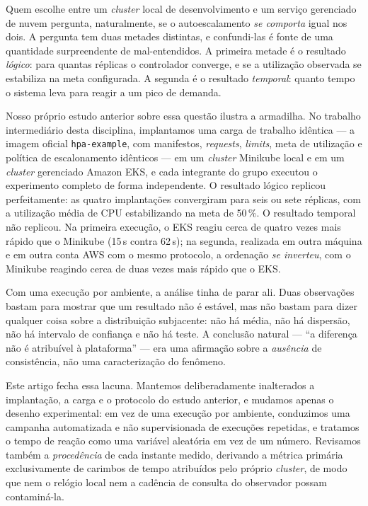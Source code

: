 \documentclass[conference]{IEEEtran}
\begin{document}
Quem escolhe entre um \emph{cluster} local de desenvolvimento e um serviço
gerenciado de nuvem pergunta, naturalmente, se o autoescalamento \emph{se
comporta} igual nos dois. A pergunta tem duas metades distintas, e confundi-las é
fonte de uma quantidade surpreendente de mal-entendidos. A primeira metade é o
resultado \emph{lógico}: para quantas réplicas o controlador converge, e se a
utilização observada se estabiliza na meta configurada. A segunda é o resultado
\emph{temporal}: quanto tempo o sistema leva para reagir a um pico de demanda.

Nosso próprio estudo anterior sobre essa questão ilustra a armadilha. No trabalho
intermediário desta disciplina, implantamos uma carga de trabalho idêntica --- a
imagem oficial \texttt{hpa-example}, com manifestos, \emph{requests},
\emph{limits}, meta de utilização e política de escalonamento idênticos --- em um
\emph{cluster} Minikube local e em um \emph{cluster} gerenciado Amazon EKS, e
cada integrante do grupo executou o experimento completo de forma independente. O
resultado lógico replicou perfeitamente: as quatro implantações convergiram para
seis ou sete réplicas, com a utilização média de CPU estabilizando na meta de
50\,\%. O resultado temporal não replicou. Na primeira execução, o EKS reagiu
cerca de quatro vezes mais rápido que o Minikube (15\,s contra 62\,s); na
segunda, realizada em outra máquina e em outra conta AWS com o mesmo protocolo, a
ordenação \emph{se inverteu}, com o Minikube reagindo cerca de duas vezes mais
rápido que o EKS.

Com uma execução por ambiente, a análise tinha de parar ali. Duas observações
bastam para mostrar que um resultado não é estável, mas não bastam para dizer
qualquer coisa sobre a distribuição subjacente: não há média, não há dispersão,
não há intervalo de confiança e não há teste. A conclusão natural --- ``a
diferença não é atribuível à plataforma'' --- era uma afirmação sobre a
\emph{ausência} de consistência, não uma caracterização do fenômeno.

Este artigo fecha essa lacuna. Mantemos deliberadamente inalterados a
implantação, a carga e o protocolo do estudo anterior, e mudamos apenas o desenho
experimental: em vez de uma execução por ambiente, conduzimos uma campanha
automatizada e não supervisionada de execuções repetidas, e tratamos o tempo de
reação como uma variável aleatória em vez de um número. Revisamos também a
\emph{procedência} de cada instante medido, derivando a métrica primária
exclusivamente de carimbos de tempo atribuídos pelo próprio \emph{cluster}, de
modo que nem o relógio local nem a cadência de consulta do observador possam
contaminá-la.
\end{document}
